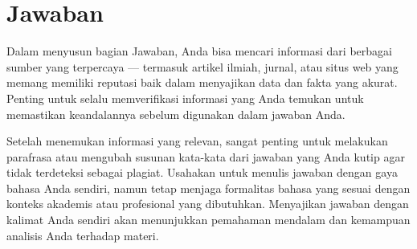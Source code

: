 \chapter{Jawaban}


Dalam menyusun bagian Jawaban, Anda bisa mencari informasi dari berbagai sumber yang terpercaya --- termasuk artikel ilmiah, jurnal, atau situs web yang memang memiliki reputasi baik dalam menyajikan data dan fakta yang akurat. Penting untuk selalu memverifikasi informasi yang Anda temukan untuk memastikan keandalannya sebelum digunakan dalam jawaban Anda.

Setelah menemukan informasi yang relevan, sangat penting untuk melakukan parafrasa atau mengubah susunan kata-kata dari jawaban yang Anda kutip agar tidak terdeteksi sebagai plagiat. Usahakan untuk menulis jawaban dengan gaya bahasa Anda sendiri, namun tetap menjaga formalitas bahasa yang sesuai dengan konteks akademis atau profesional yang dibutuhkan. Menyajikan jawaban dengan kalimat Anda sendiri akan menunjukkan pemahaman mendalam dan kemampuan analisis Anda terhadap materi.